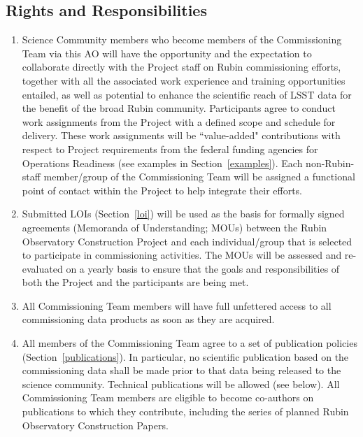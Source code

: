 \documentclass[SE,authoryear,toc,lsstdraft]{lsstdoc}
\begin{document}
\subsection{Rights and Responsibilities}
\label{rights_responsibilities}

\begin{enumerate}

\item Science Community members who become members of the Commissioning Team via this AO will have the opportunity and the expectation to collaborate directly with the Project staff on Rubin commissioning efforts, together with all the associated work experience and training opportunities entailed, as well as potential to enhance the scientific reach of LSST data for the benefit of the broad Rubin community. Participants agree to conduct work assignments from the Project with a defined scope and schedule for delivery. These work assignments will be ``value-added" contributions with respect to Project requirements from the federal funding agencies for Operations Readiness (see examples in Section~\ref{examples}). Each non-Rubin-staff member/group of the Commissioning Team will be assigned a functional point of contact within the Project to help integrate their efforts.

\item Submitted LOIs (Section~\ref{loi}) will be used as the basis for formally signed agreements (Memoranda of Understanding; MOUs) between the Rubin Observatory Construction Project and each individual/group that is selected to participate in commissioning activities. The MOUs will be assessed and re-evaluated on a yearly basis to ensure that the goals and responsibilities of both the Project and the participants are being met. 

\item All Commissioning Team members will have full unfettered access to all commissioning data products as soon as they are acquired. 

\item All members of the Commissioning Team agree to a set of publication policies (Section~\ref{publications}). In particular, no scientific publication based on the commissioning data shall be made prior to that data being released to the science community.  Technical publications will be allowed (see below). All Commissioning Team members are eligible to become co-authors on publications to which they contribute, including the series of planned Rubin Observatory Construction Papers.


\end{enumerate}
\end{document}

